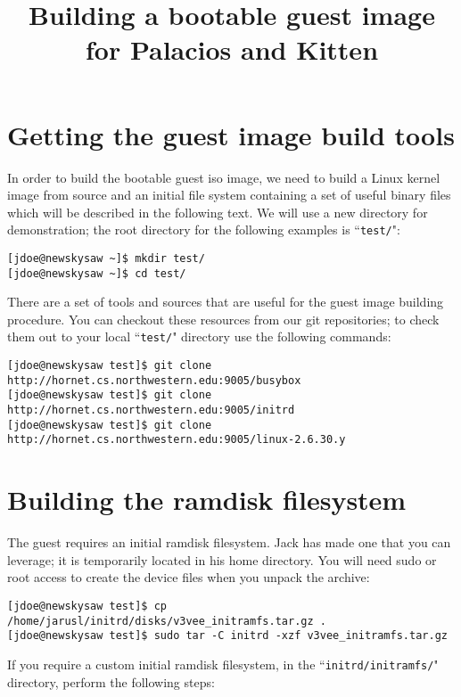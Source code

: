\documentclass{article}[11pt]
\title{Building a bootable guest image for Palacios and Kitten}
\begin{document}
\maketitle

\section{Getting the guest image build tools}

In order to build the bootable guest iso image, we need to build a Linux kernel
image from source and an initial file system containing a set of useful binary
files which will be described in the following text. We will use a new directory
for demonstration; the root directory for the following examples is
``\verb+test/+":

\begin{verbatim}
[jdoe@newskysaw ~]$ mkdir test/
[jdoe@newskysaw ~]$ cd test/
\end{verbatim}

\vspace{10pt}
\noindent
There are a set of tools and sources that are useful for the guest image
building procedure. You can checkout these resources from our git repositories;
to check them out to your local ``\verb+test/+" directory use the following
commands: 

\begin{verbatim}
[jdoe@newskysaw test]$ git clone http://hornet.cs.northwestern.edu:9005/busybox
[jdoe@newskysaw test]$ git clone http://hornet.cs.northwestern.edu:9005/initrd
[jdoe@newskysaw test]$ git clone http://hornet.cs.northwestern.edu:9005/linux-2.6.30.y
\end{verbatim}

\section{Building the ramdisk filesystem}
The guest requires an initial ramdisk filesystem. Jack has made one that you can
leverage; it is temporarily located in his home directory.  You will need sudo
or root access to create the device files when you unpack the archive:

\begin{verbatim}
[jdoe@newskysaw test]$ cp /home/jarusl/initrd/disks/v3vee_initramfs.tar.gz .
[jdoe@newskysaw test]$ sudo tar -C initrd -xzf v3vee_initramfs.tar.gz
\end{verbatim}

\noindent
If you require a custom initial ramdisk filesystem, in the
``\verb|initrd/initramfs/|" directory, perform the following steps:
\end{document}

